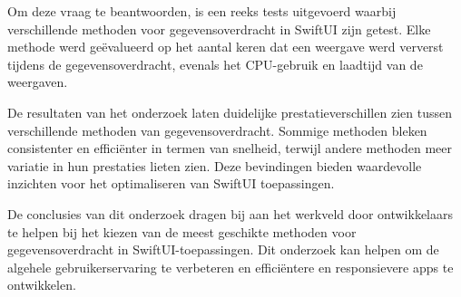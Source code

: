 Om deze vraag te beantwoorden, is een reeks tests uitgevoerd waarbij verschillende methoden voor gegevensoverdracht in SwiftUI zijn getest. Elke methode werd geëvalueerd op het aantal keren dat een weergave werd ververst tijdens de gegevensoverdracht, evenals het  CPU-gebruik en laadtijd van de weergaven.

De resultaten van het onderzoek laten duidelijke prestatieverschillen zien tussen verschillende methoden van gegevensoverdracht. Sommige methoden bleken consistenter en efficiënter in termen van snelheid, terwijl andere methoden meer variatie in hun prestaties lieten zien. Deze bevindingen bieden waardevolle inzichten voor het optimaliseren van SwiftUI toepassingen.

De conclusies van dit onderzoek dragen bij aan het werkveld door ontwikkelaars te helpen bij het kiezen van de meest geschikte methoden voor gegevensoverdracht in SwiftUI-toepassingen. Dit onderzoek kan helpen om de algehele gebruikerservaring te verbeteren en efficiëntere en responsievere apps te ontwikkelen.